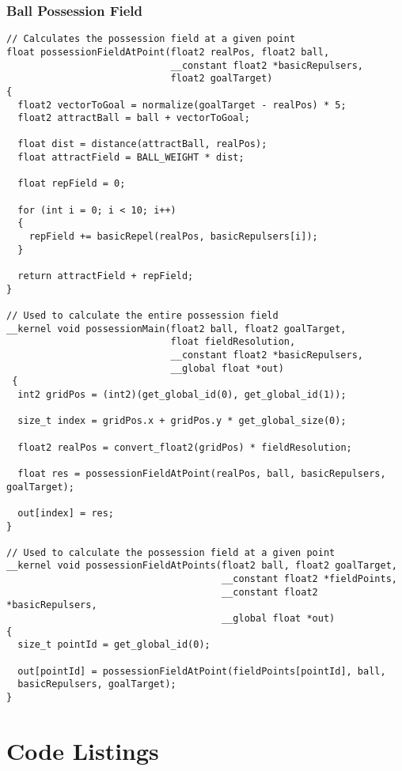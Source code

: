 \subsubsection{Ball Possession Field \label{app:possessionField}}

\begin{lstlisting}
// Calculates the possession field at a given point
float possessionFieldAtPoint(float2 realPos, float2 ball, 
                             __constant float2 *basicRepulsers, 
                             float2 goalTarget) 
{
  float2 vectorToGoal = normalize(goalTarget - realPos) * 5;
  float2 attractBall = ball + vectorToGoal;

  float dist = distance(attractBall, realPos);
  float attractField = BALL_WEIGHT * dist;

  float repField = 0;

  for (int i = 0; i < 10; i++)
  {
    repField += basicRepel(realPos, basicRepulsers[i]);
  }

  return attractField + repField;
}

// Used to calculate the entire possession field
__kernel void possessionMain(float2 ball, float2 goalTarget, 
                             float fieldResolution, 
                             __constant float2 *basicRepulsers, 
                             __global float *out) 
 { 
  int2 gridPos = (int2)(get_global_id(0), get_global_id(1));

  size_t index = gridPos.x + gridPos.y * get_global_size(0);

  float2 realPos = convert_float2(gridPos) * fieldResolution;

  float res = possessionFieldAtPoint(realPos, ball, basicRepulsers, goalTarget);

  out[index] = res;
}

// Used to calculate the possession field at a given point
__kernel void possessionFieldAtPoints(float2 ball, float2 goalTarget, 
                                      __constant float2 *fieldPoints, 
                                      __constant float2 *basicRepulsers, 
                                      __global float *out) 
{
  size_t pointId = get_global_id(0);

  out[pointId] = possessionFieldAtPoint(fieldPoints[pointId], ball,
  basicRepulsers, goalTarget); 
}
\end{lstlisting}

\section{Code Listings}

